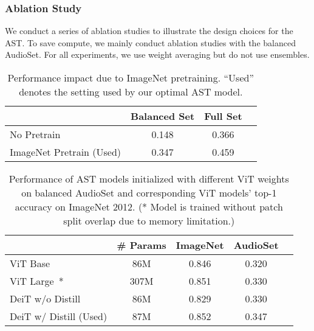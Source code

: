 \documentclass[a4paper]{article}
\newcommand{\squeezeup}{\vspace{-2.0mm}}
\begin{document}
\subsubsection{Ablation Study}
\label{sec:ablation}

We conduct a series of ablation studies to illustrate the design choices for the AST. To save compute, we mainly conduct ablation studies with the balanced AudioSet. For all experiments, we use weight averaging but do not use ensembles.

\begin{table}[t]
\footnotesize
\centering
\caption{Performance impact due to ImageNet pretraining. ``Used'' denotes the setting used by our optimal AST model.}
\label{tab:pretrain}
\begin{tabular}{@{}lccc@{}}
\toprule
                               & Balanced Set & Full Set  \\ \midrule
No Pretrain                  &  0.148           &   0.366                  \\
ImageNet Pretrain (Used)     &  0.347        &   0.459                  \\ \bottomrule
\end{tabular}
\end{table}

\begin{table}[t]
\footnotesize
\centering
\caption{Performance of AST models initialized with different ViT weights on balanced AudioSet and corresponding ViT models' top-1 accuracy on ImageNet 2012. (* Model is trained without patch split overlap due to memory limitation.)}
\label{tab:arc}
\begin{tabular}{@{}lcccc@{}}
\toprule
                               & \# Params & ImageNet & AudioSet  \\ \midrule
ViT Base~\cite{dosovitskiy2021image}           &  86M      &0.846      &   0.320                  \\
ViT Large~\cite{dosovitskiy2021image}*         &  307M     &0.851       &   0.330                  \\
DeiT w/o Distill~\cite{touvron2020deit}          &  86M      &0.829      &   0.330                  \\
DeiT w/ Distill (Used)        &  87M     &0.852       &   0.347                  \\
\bottomrule
\end{tabular}
\squeezeup
\end{table}
\end{document}
